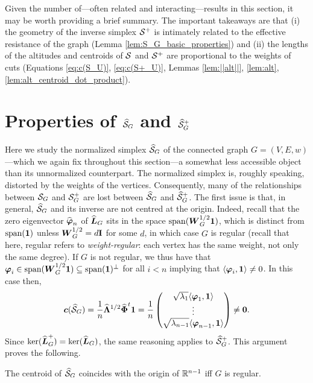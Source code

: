 Given the number of---often related and interacting---results in this section, it may be worth providing a brief summary. The important takeaways are that (i) the geometry of the inverse simplex $\mathcal{S}^+$ is intimately related to the effective resistance of the graph (Lemma \ref{lem:S_G_basic_properties}) and (ii) the lengths of the altitudes and centroids of $\mathcal{S}$ and $\mathcal{S}^+$ are proportional to the weights of cuts (Equations \eqref{eq:c(S_U)}, \eqref{eq:c(S+_U)}, Lemmas \ref{lem:||alt||}, \ref{lem:alt}, \ref{lem:alt_centroid_dot_product}). 

\section{Properties of \texorpdfstring{$\widehat{\mathcal{S}}_G$}{the normalized Simplex} and \texorpdfstring{$\widehat{\mathcal{S}}_G^+$}{and its inverse}}
\label{sec:Sn_G}

Here we study the normalized simplex $\widehat{\mathcal{S}}_G$ of the connected graph $G=(V,E,w)$---which we again fix throughout this section---a somewhat less accessible object than its unnormalized counterpart.  The normalized simplex is, roughly speaking, distorted by the weights of the vertices. Consequently, many of the relationships between $\mathcal{S}_G$ and $\mathcal{S}_G^+$ are lost between $\widehat{\mathcal{S}}_G$ and $\widehat{\mathcal{S}}_G^+$. The first issue is that, in general, $\widehat{\mathcal{S}}_G$ and its inverse are not centred at the origin. Indeed, recall that the zero eigenvector $\widehat{\vb*{\varphi}}_n$ of $\widehat{\vb*{L}}_G$ sits in the space $\textnormal{span}(\vb*{W}^{1/2}_G\vb{1})$, which is distinct from $\textnormal{span}(\vb{1})$ unless $\vb*{W}^{1/2}_G=d\vb{I}$ for some $d$, in which case $G$ is regular (recall  that here, regular refers  to \emph{weight-regular}: each vertex has  the same weight, not only the same degree).
If $G$ is not regular, we thus have that $\vb*{\varphi}_i \in \textnormal{span}(\vb*{W}^{1/2}_G\vb{1})\subseteq \textnormal{span}(\vb{1})^\perp$ for all $i<n$ implying that $\langle \vb*{\varphi}_i,\vb{1}\rangle \neq 0$. In this case then,  
 \[\vb*{c}(\widehat{\mathcal{S}}_G) = \frac{1}{n} \widehat{\vb{\Lambda}}^{1/2}\widehat{\boldsymbol{\Phi}}^t \vb{1} = \frac{1}{n} \begin{pmatrix}
 \sqrt{\lambda_1}\langle \vb*{\varphi}_1,\vb{1}\rangle \\
 \vdots \\
\sqrt{ \lambda_{n-1}}\langle \vb*{\varphi}_{n-1},\vb{1} \rangle
 \end{pmatrix}\neq \vb{0}.\]
Since $\ker(\widehat{\vb*{L}}_G^+)=\ker(\widehat{\vb*{L}}_G)$, the same reasoning applies to $\widehat{\mathcal{S}}_G^+$. This argument proves the following.

\begin{lemma}
	\label{lem:centroid_normalized}
	The centroid of $\widehat{\mathcal{S}}_G$ coincides with the origin of $\mathbb{R}^{n-1}$ iff $G$ is regular. 
\end{lemma}

